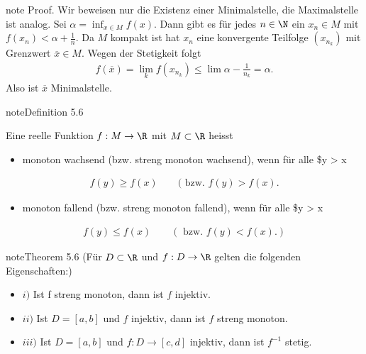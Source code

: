 \documentclass[letterpaper,10pt,english]{jupyterBook}
\begin{document}
\begin{sphinxadmonition}{note}
Proof. Wir beweisen nur die Existenz einer Minimalstelle, die Maximalstelle ist analog. Sei \(\alpha = \inf_{x \in M} f(x)\). Dann gibt es für jedes \(n \in \N\) ein \(x_n \in M\) mit \(f(x_n) < \alpha+ \frac{1}n\). Da \(M\) kompakt ist hat \(x_n\) eine konvergente Teilfolge \((x_{n_k})\) mit Grenzwert \(\overline{x} \in M\). Wegen der Stetigkeit folgt
\begin{equation*}
\begin{split} f(\overline{x}) = \lim_k f(x_{n_k}) \leq \lim \alpha - \frac{1}{n_k} = \alpha.\end{split}
\end{equation*}
Also ist \(\overline{x}\) Minimalstelle.
\end{sphinxadmonition}
\label{stetigkeit/eigenschaften:definition-3}
\begin{sphinxadmonition}{note}{Definition 5.6}



Eine reelle Funktion \(f: M \rightarrow \R\) mit \(M \subset \R\) heisst
\begin{itemize}
\item {} 
monoton wachsend (bzw. streng monoton wachsend), wenn für alle \$y > x

\end{itemize}
\begin{equation*}
\begin{split} f(y) \geq f(x) \qquad (\text{ bzw. } f(y) > f(x).\end{split}
\end{equation*}\begin{itemize}
\item {} 
monoton fallend (bzw. streng monoton fallend), wenn für alle \$y > x

\end{itemize}
\begin{equation*}
\begin{split} f(y) \leq f(x) \qquad (\text{ bzw. } f(y) < f(x). )\end{split}
\end{equation*}\end{sphinxadmonition}
\label{stetigkeit/eigenschaften:theorem-4}
\begin{sphinxadmonition}{note}{Theorem 5.6 (Für \protect\(D \subset \R\protect\) und \protect\(f: D \rightarrow \R\protect\) gelten die folgenden Eigenschaften:)}


\begin{itemize}
\item {} 
\(i)\) Ist f streng monoton, dann ist \(f\) injektiv.

\item {} 
\(ii)\) Ist \(D=[a,b]\) und \(f\) injektiv, dann ist \(f\) streng monoton.

\item {} 
\(iii)\) Ist \(D=[a,b]\) und \(f:D \rightarrow [c,d]\) injektiv, dann ist \(f^{-1}\) stetig.

\end{itemize}
\end{sphinxadmonition}
\end{document}
